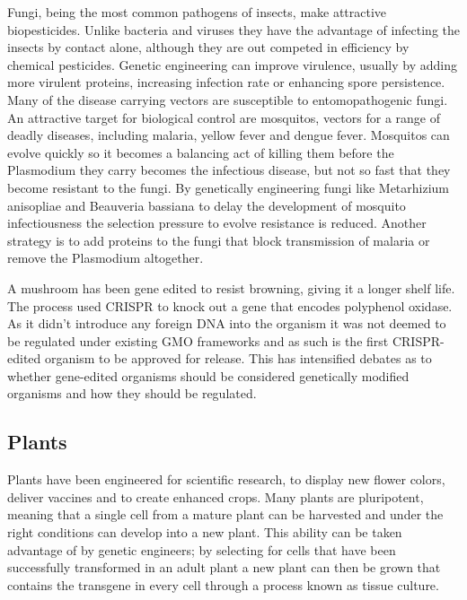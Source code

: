 Fungi, being the most common pathogens of insects, make attractive biopesticides. Unlike bacteria and viruses they have the advantage of infecting the insects by contact alone, although they are out competed in efficiency by chemical pesticides. Genetic engineering can improve virulence, usually by adding more virulent proteins, increasing infection rate or enhancing spore persistence. Many of the disease carrying vectors are susceptible to entomopathogenic fungi. An attractive target for biological control are mosquitos, vectors for a range of deadly diseases, including malaria, yellow fever and dengue fever. Mosquitos can evolve quickly so it becomes a balancing act of killing them before the Plasmodium they carry becomes the infectious disease, but not so fast that they become resistant to the fungi. By genetically engineering fungi like Metarhizium anisopliae and Beauveria bassiana to delay the development of mosquito infectiousness the selection pressure to evolve resistance is reduced. Another strategy is to add proteins to the fungi that block transmission of malaria or remove the Plasmodium altogether.

A mushroom has been gene edited to resist browning, giving it a longer shelf life. The process used CRISPR to knock out a gene that encodes polyphenol oxidase. As it didn't introduce any foreign DNA into the organism it was not deemed to be regulated under existing GMO frameworks and as such is the first CRISPR-edited organism to be approved for release. This has intensified debates as to whether gene-edited organisms should be considered genetically modified organisms and how they should be regulated.

\hypertarget{plants}{%
\subsection{Plants}\label{plants}}

Plants have been engineered for scientific research, to display new flower colors, deliver vaccines and to create enhanced crops. Many plants are pluripotent, meaning that a single cell from a mature plant can be harvested and under the right conditions can develop into a new plant. This ability can be taken advantage of by genetic engineers; by selecting for cells that have been successfully transformed in an adult plant a new plant can then be grown that contains the transgene in every cell through a process known as tissue culture.


